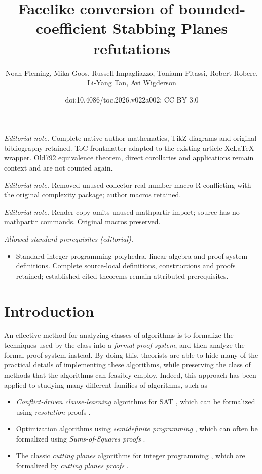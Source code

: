 \documentclass[11pt]{article}
\title{Facelike conversion of bounded-coefficient Stabbing Planes refutations}
\author{Noah Fleming, Mika Goos, Russell Impagliazzo, Toniann Pitassi, Robert Robere, Li-Yang Tan, Avi Wigderson}
\date{doi:10.4086/toc.2026.v022a002; CC BY 3.0}
\begin{document}
\maketitle
\noindent\textit{Editorial note.} Complete native author mathematics, TikZ diagrams and original bibliography retained. ToC frontmatter adapted to the existing article XeLaTeX wrapper. Old792 equivalence theorem, direct corollaries and applications remain context and are not counted again.\par\medskip
\noindent\textit{Editorial note.} Removed unused collector real-number macro R conflicting with the original complexity package; author macros retained.\par\medskip
\noindent\textit{Editorial note.} Render copy omits unused mathpartir import; source has no mathpartir commands. Original macros preserved.\par\medskip
\noindent\textit{Allowed standard prerequisites (editorial).}\begin{itemize}
\item Standard integer-programming polyhedra, linear algebra and proof-system definitions. Complete source-local definitions, constructions and proofs retained; established cited theorems remain attributed prerequisites.
\end{itemize}\medskip
\section{Introduction}
\label{sec:intro}
%

An effective method for analyzing classes of algorithms is to formalize the techniques used by the class into a \emph{formal proof system}, and then analyze the formal proof system instead. 
By doing this, theorists are able to hide many of the practical details of implementing these algorithms, while preserving the class of methods that the algorithms can feasibly employ.
Indeed, this approach has been applied to %
studying  %
many different families of algorithms, such as 
\begin{itemize}
\item \emph{Conflict-driven clause-learning} algorithms for SAT
\cite{BayardoS97,MarquesS99,MoskewiczMZZM01}, 
which can be formalized using \emph{resolution} proofs \cite{DavisP60}.
	\item Optimization algorithms using \emph{semidefinite programming} \cite{Goemans1994,parrilo2000}, which can often be formalized using \emph{Sums-of-Squares proofs} \cite{dima-sos,BarakBHKSZ12}.
	\item The classic \emph{cutting planes} algorithms for integer programming \cite{gomory1963algorithm,Chvatal73a}, which are formalized by \emph{cutting planes proofs} \cite{Chvatal73a, Chvatal84, CookCT87}.
\end{itemize}
\end{document}

